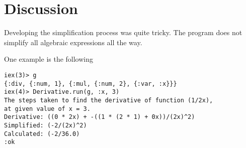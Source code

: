 \documentclass[a4paper,11pt]{article}
\begin{document}
\section*{Discussion}
\label{sec:discussion}
    Developing the simplification process was quite tricky.
    The program does not simplify all algebraic expressions all the way.

    One example is the following

\begin{verbatim}
iex(3)> g
{:div, {:num, 1}, {:mul, {:num, 2}, {:var, :x}}}
iex(4)> Derivative.run(g, :x, 3)
The steps taken to find the derivative of function (1/2x),
at given value of x = 3.
Derivative: ((0 * 2x) + -((1 * (2 * 1) + 0x))/(2x)^2)
Simplified: (-2/(2x)^2)
Calculated: (-2/36.0)
:ok
\end{verbatim}
\end{document}

